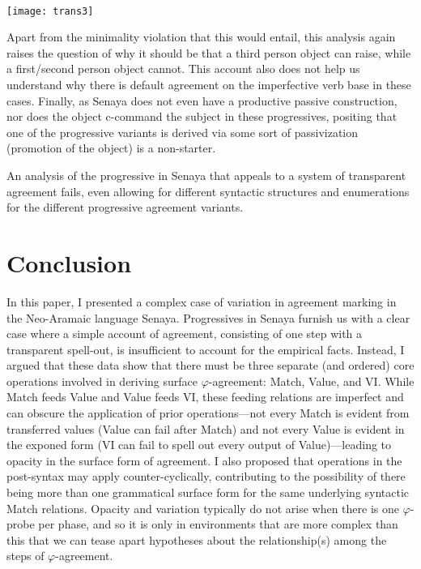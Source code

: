 \documentclass[output=paper
,modfonts
,nonflat]{langsci/langscibook}
\begin{document}
\ea \label{SDOtrans} \- \\ \texttt{[image: trans3]}
\z

\noindent Apart from the minimality violation that this would entail, this analysis again raises the question of why it should be that a third person object can raise, while a first/second person object cannot. This account also does not help us understand why there is default agreement on the imperfective verb base in these cases. Finally, as Senaya does not even have a productive passive construction, nor does the object c-command the subject in these progressives, positing that one of the progressive variants is derived via some sort of passivization (promotion of the object) is a non-starter.

An analysis of the progressive in Senaya that appeals to a system of transparent agreement fails, even allowing for different syntactic structures and enumerations for the different progressive agreement variants.

\section{Conclusion}

In this paper, I presented a complex case of variation in agreement marking in the Neo-Aramaic language Senaya. Progressives in Senaya furnish us with a clear case where a simple account of agreement, consisting of one step with a transparent spell-out, is insufficient to account for the empirical facts. Instead, I argued that these data show that there must be three separate (and ordered) core operations involved in deriving surface $\varphi$-agreement: Match, Value, and VI. While Match feeds Value and Value feeds VI, these feeding relations are imperfect and can obscure the application of prior operations---not every Match is evident from transferred values (Value can fail after Match) and not every Value is evident in the exponed form (VI can fail to spell out every output of Value)---leading to opacity in the surface form of agreement. I also proposed that operations in the post-syntax may apply counter-cyclically, contributing to the possibility of there being more than one grammatical surface form for the same underlying syntactic Match relations. Opacity and variation typically do not arise when there is one $\varphi$-probe per phase, and so it is only in environments that are more complex than this that we can tease apart hypotheses about the relationship(s) among the steps of $\varphi$-agreement.
\end{document}
